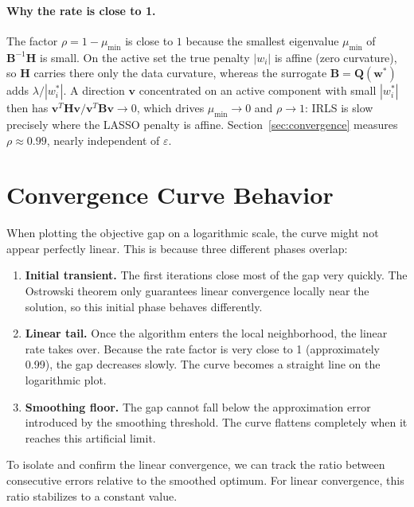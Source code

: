 \paragraph{Why the rate is close to 1.}
The factor $\rho=1-\mu_{\min}$ is close to $1$ because the smallest eigenvalue
$\mu_{\min}$ of $\mathbf{B}^{-1}\mathbf{H}$ is small. On the active set the true penalty
$|w_i|$ is affine (zero curvature), so $\mathbf{H}$ carries there only the data curvature,
whereas the surrogate $\mathbf{B}=\mathbf{Q}(\mathbf{w}^*)$ adds $\lambda/|w^*_i|$. A direction
$\mathbf{v}$ concentrated on an active component with small $|w^*_i|$ then has
$\mathbf{v}^T\mathbf{H}\mathbf{v}/\mathbf{v}^T\mathbf{B}\mathbf{v}\to 0$, which drives
$\mu_{\min}\to 0$ and $\rho\to 1$: IRLS is slow precisely where the LASSO penalty is affine.
Section~\ref{sec:convergence} measures $\rho\approx 0.99$, nearly independent of $\varepsilon$.

\section{Convergence Curve Behavior}
\label{app:sec:nonlinear}

When plotting the objective gap on a logarithmic scale, the curve might not appear perfectly linear. This is because three different phases overlap:

\begin{enumerate}
    \item \textbf{Initial transient.} The first iterations close most of the gap very quickly. The Ostrowski theorem only guarantees linear convergence locally near the solution, so this initial phase behaves differently.
    \item \textbf{Linear tail.} Once the algorithm enters the local neighborhood, the linear rate takes over. Because the rate factor is very close to 1 (approximately 0.99), the gap decreases slowly. The curve becomes a straight line on the logarithmic plot.
    \item \textbf{Smoothing floor.} The gap cannot fall below the approximation error introduced by the smoothing threshold. The curve flattens completely when it reaches this artificial limit.
\end{enumerate}

To isolate and confirm the linear convergence, we can track the ratio between consecutive errors relative to the smoothed optimum. For linear convergence, this ratio stabilizes to a constant value.




